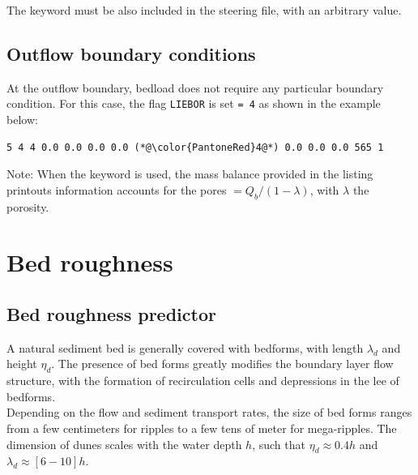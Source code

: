 The keyword  must be also included in the steering file, with an arbitrary value.

\subsection{Outflow boundary conditions}
At the outflow boundary, bedload does not require any particular boundary condition.
For this case, the flag \texttt{LIEBOR} is set \texttt{= 4} as shown in the example below:

\begin{lstlisting}[frame=trBL]
5 4 4 0.0 0.0 0.0 0.0 (*@\color{PantoneRed}4@*) 0.0 0.0 0.0 565 1
\end{lstlisting}

\begin{WarningBlock}{Note:}
When the keyword  is used, the mass balance provided in the listing printouts information accounts for the pores $=Q_b/(1-\lambda)$, with $\lambda$ the porosity.
\end{WarningBlock}

\section{Bed roughness}\label{sec:bedroughpredictor}
\subsection{Bed roughness predictor}
A natural sediment bed is generally covered with bedforms, with length $\lambda_d$
and height $\eta_d$. The presence of bed forms greatly modifies the boundary
layer flow structure, with the formation of recirculation cells and
depressions in the lee of bedforms.\\

Depending on the flow and sediment transport rates, the size of bed
forms ranges from a few centimeters for ripples to a few tens of meter for
mega-ripples. The dimension of dunes scales with the water depth $h$, such that $\eta_d
\approx 0.4 h$ and  $\lambda_d\approx [6-10] h$.\\

